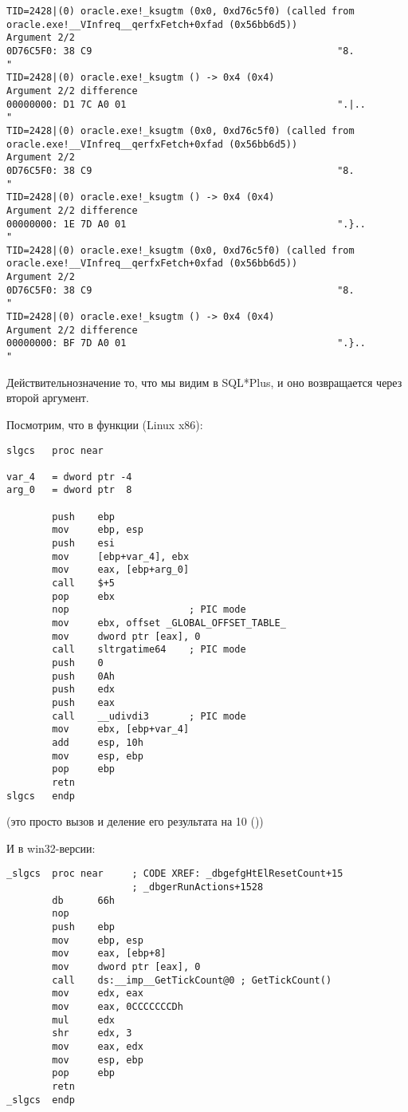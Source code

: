 \begin{lstlisting}[caption=вывод \tracer]
TID=2428|(0) oracle.exe!_ksugtm (0x0, 0xd76c5f0) (called from oracle.exe!__VInfreq__qerfxFetch+0xfad (0x56bb6d5))
Argument 2/2
0D76C5F0: 38 C9                                           "8.              "
TID=2428|(0) oracle.exe!_ksugtm () -> 0x4 (0x4)
Argument 2/2 difference
00000000: D1 7C A0 01                                     ".|..            "
TID=2428|(0) oracle.exe!_ksugtm (0x0, 0xd76c5f0) (called from oracle.exe!__VInfreq__qerfxFetch+0xfad (0x56bb6d5))
Argument 2/2
0D76C5F0: 38 C9                                           "8.              "
TID=2428|(0) oracle.exe!_ksugtm () -> 0x4 (0x4)
Argument 2/2 difference
00000000: 1E 7D A0 01                                     ".}..            "
TID=2428|(0) oracle.exe!_ksugtm (0x0, 0xd76c5f0) (called from oracle.exe!__VInfreq__qerfxFetch+0xfad (0x56bb6d5))
Argument 2/2
0D76C5F0: 38 C9                                           "8.              "
TID=2428|(0) oracle.exe!_ksugtm () -> 0x4 (0x4)
Argument 2/2 difference
00000000: BF 7D A0 01                                     ".}..            "
\end{lstlisting}

Действительно\EMDASH{}значение то, что мы видим в SQL*Plus, и оно возвращается через второй аргумент.

Посмотрим, что в функции  (Linux x86):

\begin{lstlisting}
slgcs   proc near

var_4   = dword ptr -4
arg_0   = dword ptr  8

        push    ebp
        mov     ebp, esp
        push    esi
        mov     [ebp+var_4], ebx
        mov     eax, [ebp+arg_0]
        call    $+5
        pop     ebx
        nop                     ; PIC mode
        mov     ebx, offset _GLOBAL_OFFSET_TABLE_
        mov     dword ptr [eax], 0
        call    sltrgatime64    ; PIC mode
        push    0
        push    0Ah
        push    edx
        push    eax
        call    __udivdi3       ; PIC mode
        mov     ebx, [ebp+var_4]
        add     esp, 10h
        mov     esp, ebp
        pop     ebp
        retn
slgcs   endp
\end{lstlisting}

(это просто вызов  и деление его результата на 10 ())

И в win32-версии:

\begin{lstlisting}
_slgcs  proc near     ; CODE XREF: _dbgefgHtElResetCount+15
                      ; _dbgerRunActions+1528
        db      66h
        nop
        push    ebp
        mov     ebp, esp
        mov     eax, [ebp+8]
        mov     dword ptr [eax], 0
        call    ds:__imp__GetTickCount@0 ; GetTickCount()
        mov     edx, eax
        mov     eax, 0CCCCCCCDh
        mul     edx
        shr     edx, 3
        mov     eax, edx
        mov     esp, ebp
        pop     ebp
        retn
_slgcs  endp
\end{lstlisting}

